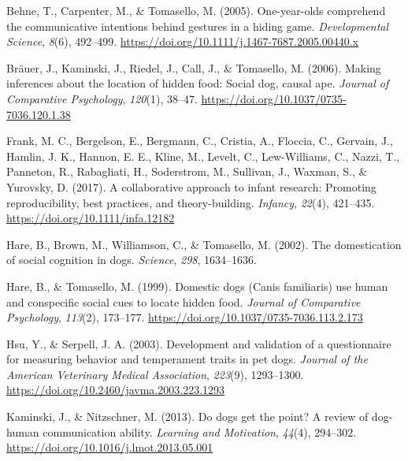 \documentclass[
  pub,floatsintext]{apa6}
\newlength{\cslhangindent}
\newlength{\cslentryspacingunit} %
\newenvironment{CSLReferences}[2] %
 {%
  \setlength{\parindent}{0pt}
  \ifodd #1
  \let\oldpar\par
  \def\par{\hangindent=\cslhangindent\oldpar}
  \fi
  \setlength{\parskip}{#2\cslentryspacingunit}
 }%
 {}
\begin{document}
\hypertarget{refs}{}
\begin{CSLReferences}{1}{0}
\leavevmode{}%
Behne, T., Carpenter, M., \& Tomasello, M. (2005). One-year-olds comprehend the communicative intentions behind gestures in a hiding game. \emph{Developmental Science}, \emph{8}(6), 492--499. \url{https://doi.org/10.1111/j.1467-7687.2005.00440.x}

\leavevmode{}%
Bräuer, J., Kaminski, J., Riedel, J., Call, J., \& Tomasello, M. (2006). Making inferences about the location of hidden food: {Social} dog, causal ape. \emph{Journal of Comparative Psychology}, \emph{120}(1), 38--47. \url{https://doi.org/10.1037/0735-7036.120.1.38}

\leavevmode{}%
Frank, M. C., Bergelson, E., Bergmann, C., Cristia, A., Floccia, C., Gervain, J., Hamlin, J. K., Hannon, E. E., Kline, M., Levelt, C., Lew-Williams, C., Nazzi, T., Panneton, R., Rabagliati, H., Soderstrom, M., Sullivan, J., Waxman, S., \& Yurovsky, D. (2017). A collaborative approach to infant research: Promoting reproducibility, best practices, and theory-building. \emph{Infancy}, \emph{22}(4), 421--435. \url{https://doi.org/10.1111/infa.12182}

\leavevmode{}%
Hare, B., Brown, M., Williamson, C., \& Tomasello, M. (2002). The domestication of social cognition in dogs. \emph{Science}, \emph{298}, 1634--1636.

\leavevmode{}%
Hare, B., \& Tomasello, M. (1999). Domestic dogs ({Canis} familiaris) use human and conspecific social cues to locate hidden food. \emph{Journal of Comparative Psychology}, \emph{113}(2), 173--177. \url{https://doi.org/10.1037/0735-7036.113.2.173}

\leavevmode{}%
Hsu, Y., \& Serpell, J. A. (2003). Development and validation of a questionnaire for measuring behavior and temperament traits in pet dogs. \emph{Journal of the American Veterinary Medical Association}, \emph{223}(9), 1293--1300. \url{https://doi.org/10.2460/javma.2003.223.1293}

\leavevmode{}%
Kaminski, J., \& Nitzschner, M. (2013). Do dogs get the point? {A} review of dog-human communication ability. \emph{Learning and Motivation}, \emph{44}(4), 294--302. \url{https://doi.org/10.1016/j.lmot.2013.05.001}


\end{CSLReferences}
\end{document}
